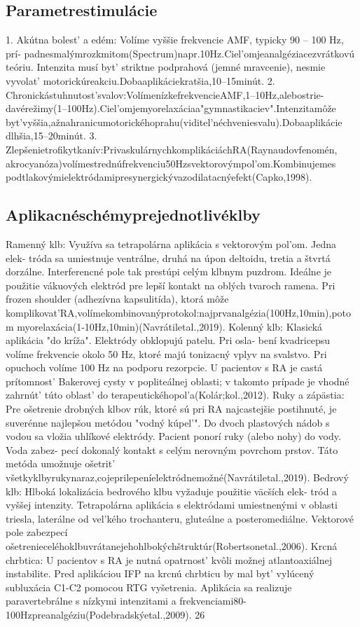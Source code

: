 \subsection{Parametrestimulácie}

1. Akútna bolest’ a edém: Volíme vyššie frekvencie AMF, typicky 90 -- 100 Hz, prí- padnesmalýmrozkmitom(Spectrum)napr.10Hz.Ciel’omjeanalgéziacezvrátkovú teóriu. Intenzita musí byt’ striktne podprahová (jemné mravcenie), nesmie vyvolat’ motorickúreakciu.Dobaaplikáciekratšia,10--15minút. 2. Chronickástuhnutost’svalov:VolímenízkefrekvencieAMF,1--10Hz,alebostrie- davérežimy(1--100Hz).Ciel’omjemyorelaxáciaa"gymnastikaciev".Intenzitamôže byt’vyššia,ažnahranicumotorickéhoprahu(viditel’néchveniesvalu).Dobaaplikácie dlhšia,15--20minút. 3. Zlepšenietrofikytkanív:PrivaskulárnychkomplikáciáchRA(Raynaudovfenomén, akrocyanóza)volímestrednúfrekvenciu50Hzsvektorovýmpol’om.Kombinujemes podtlakovýmielektródamipresynergickývazodilatacnýefekt(Capko,1998).


\subsection{Aplikacnéschémyprejednotlivéklby}

Ramenný klb: Využíva sa tetrapolárna aplikácia s vektorovým pol’om. Jedna elek- tróda sa umiestnuje ventrálne, druhá na úpon deltoidu, tretia a štvrtá dorzálne. Interferencné pole tak prestúpi celým klbnym puzdrom. Ideálne je použitie vákuových elektród pre lepší kontakt na oblých tvaroch ramena. Pri frozen shoulder (adhezívna kapsulitída), ktorá môže komplikovat’RA,volímekombinovanýprotokol:najprvanalgézia(100Hz,10min),potom myorelaxácia(1-10Hz,10min)(Navrátiletal.,2019). Kolenný klb: Klasická aplikácia "do kríža". Elektródy obklopujú patelu. Pri osla- bení kvadricepsu volíme frekvencie okolo 50 Hz, ktoré majú tonizacný vplyv na svalstvo. Pri opuchoch volíme 100 Hz na podporu rezorpcie. U pacientov s RA je castá prítomnost’ Bakerovej cysty v popliteálnej oblasti; v takomto prípade je vhodné zahrnút’ túto oblast’ do terapeutickéhopol’a(Kolár;kol.,2012). Ruky a zápästia: Pre ošetrenie drobných klbov rúk, ktoré sú pri RA najcastejšie postihnuté, je suverénne najlepšou metódou "vodný kúpel’". Do dvoch plastových nádob s vodou sa vložia uhlíkové elektródy. Pacient ponorí ruky (alebo nohy) do vody. Voda zabez- pecí dokonalý kontakt s celým nerovným povrchom prstov. Táto metóda umožnuje ošetrit’ všetkyklbyrukynaraz,cojeprilepeníelektródnemožné(Navrátiletal.,2019). Bedrový klb: Hlboká lokalizácia bedrového klbu vyžaduje použitie väcších elek- tród a vyššej intenzity. Tetrapolárna aplikácia s elektródami umiestnenými v oblasti triesla, laterálne od vel’kého trochanteru, gluteálne a posteromediálne. Vektorové pole zabezpecí ošetrenieceléhoklbuvrátanejehohlbokýchštruktúr(Robertsonetal.,2006). Krcná chrbtica: U pacientov s RA je nutná opatrnost’ kvôli možnej atlantoaxiálnej instabilite. Pred aplikáciou IFP na krcnú chrbticu by mal byt’ vylúcený subluxácia C1-C2 pomocou RTG vyšetrenia. Aplikácia sa realizuje paravertebrálne s nízkymi intenzitami a frekvenciami80-100Hzpreanalgéziu(Podebradskýetal.,2009). 26


